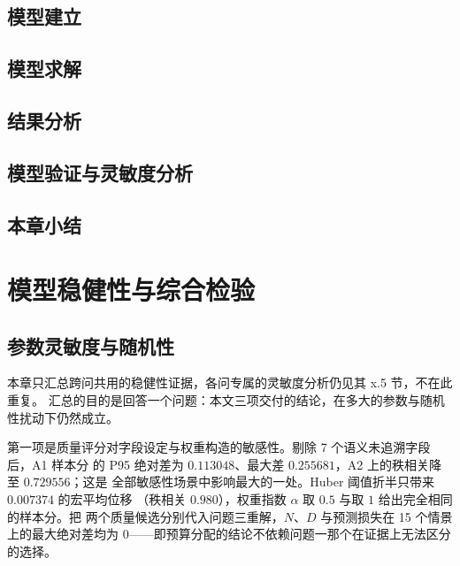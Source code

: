 \documentclass[bwprint]{gmcmthesis}
\numberwithin{equation}{section}
\numberwithin{figure}{section}
\numberwithin{table}{section}
\begin{document}
\subsection{模型建立}

\subsection{模型求解}

\subsection{结果分析}

\subsection{模型验证与灵敏度分析}

\subsection{本章小结}


\clearpage
\section{模型稳健性与综合检验}\label{sec:q3-sens}

%
%

\subsection{参数灵敏度与随机性}

本章只汇总跨问共用的稳健性证据，各问专属的灵敏度分析仍见其 x.5 节，不在此重复。
汇总的目的是回答一个问题：本文三项交付的结论，在多大的参数与随机性扰动下仍然成立。

第一项是质量评分对字段设定与权重构造的敏感性。剔除 7 个语义未追溯字段后，A1 样本分
的 P95 绝对差为 $0.113048$、最大差 $0.255681$，A2 上的秩相关降至 $0.729556$；这是
全部敏感性场景中影响最大的一处。Huber 阈值折半只带来 $0.007374$ 的宏平均位移
（秩相关 $0.980$），权重指数 $\alpha$ 取 $0.5$ 与取 $1$ 给出完全相同的样本分。把
两个质量候选分别代入问题三重解，$N$、$D$ 与预测损失在 15 个情景上的最大绝对差均为
$0$——即预算分配的结论不依赖问题一那个在证据上无法区分的选择。
\end{document}
